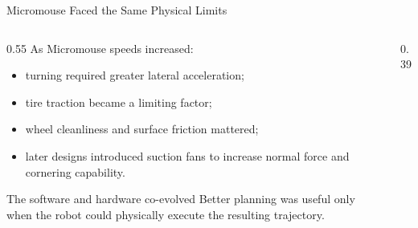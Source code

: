 \documentclass[aspectratio=169,10pt]{beamer}
\begin{document}
\begin{frame}[shrink=20]{Micromouse Faced the Same Physical Limits}
  \begin{columns}[T,onlytextwidth]
    \begin{column}{0.55\textwidth}
      As Micromouse speeds increased:
      \begin{itemize}
        \item turning required greater lateral acceleration;
        \item tire traction became a limiting factor;
        \item wheel cleanliness and surface friction mattered;
        \item later designs introduced suction fans to increase normal force and cornering capability.
      \end{itemize}

      \begin{block}{The software and hardware co-evolved}
        Better planning was useful only when the robot could physically execute the resulting trajectory.
      \end{block}
    \end{column}

    \begin{column}{0.39\textwidth}
    \end{column}
  \end{columns}

\end{frame}

\end{document}
